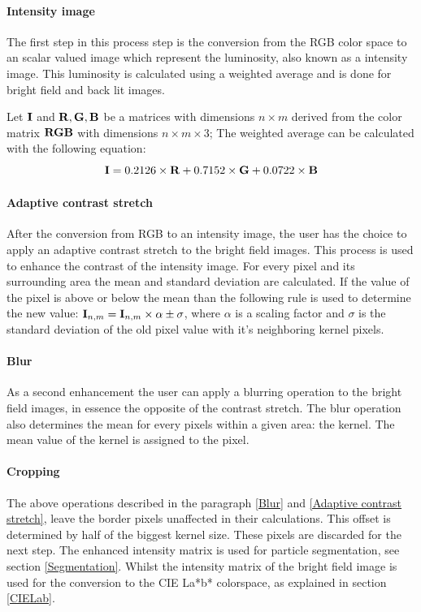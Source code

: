 \documentclass[11pt,fleqn,,a4paper,twoside,openright]{book}
\begin{document}
\paragraph{Intensity image}\label{IntensityImg} The first step in this process step is the conversion from the RGB color space to an scalar valued image which represent the luminosity, also known as a intensity image. This luminosity is calculated using a weighted average and is done for bright field and back lit images.
\begin{sBox}
	Let $\mat{I}$ and $\mat{R}, \mat{G}, \mat{B}$  be a matrices with dimensions $n \times m$ derived from the color matrix $\mat{RGB}$ with dimensions $n \times m \times 3$; The weighted average can be calculated with the following equation:
	\begin{equation}
	\mat{I} =0.2126\times \mat{R} + 0.7152\times \mat{G} + 0.0722\times \mat{B}
	\end{equation}
\end{sBox}

\paragraph{Adaptive contrast stretch}\label{Adaptive contrast stretch} After the conversion from RGB to an intensity image, the user has the choice to apply an adaptive contrast stretch to the bright field images. This process is used to enhance the contrast of the intensity image. For every pixel and its surrounding area the mean and standard deviation are calculated. If the value of the pixel is above or below the mean than the following rule is used to determine the new value: $\mat{I}_{n,m}=\mat{I}_{n,m} \times \alpha \pm \sigma$, where $\alpha$ is a scaling factor and $\sigma$ is the standard deviation of the old pixel value with it's neighboring kernel pixels.

\paragraph{Blur}\label{Blur} As a second enhancement the user can apply a blurring operation to the bright field images, in essence the opposite of the contrast stretch. The blur operation also determines the mean for every pixels within a given area: the kernel. The mean value of the kernel is assigned to the pixel.

\paragraph{Cropping}
The above operations described in the paragraph \ref{Blur} and \ref{Adaptive contrast stretch}, leave the border pixels unaffected in their calculations. This offset is determined by half of the biggest kernel size. These pixels are discarded for the next step. The enhanced intensity matrix is used for particle segmentation, see section \ref{Segmentation}. Whilst the intensity matrix of the bright field image is used for the conversion to the CIE La*b* colorspace, as explained in section \ref{CIELab}.
\end{document}
